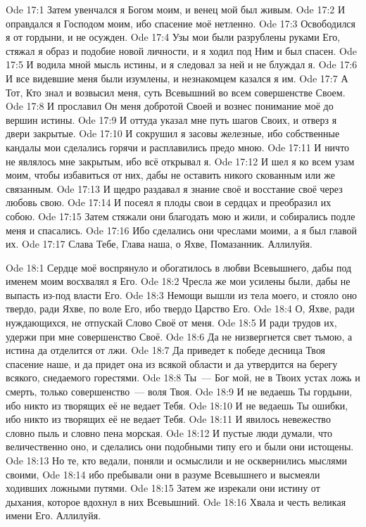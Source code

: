 \vs Ode 17:1
Затем
увенчался я Богом моим, и венец мой был живым.
\vs Ode 17:2
И оправдался я
Господом моим, ибо спасение моё нетленно.
\vs Ode 17:3
Освободился я
от гордыни, и не осужден.
\vs Ode 17:4
Узы мои были
разрублены руками Его, стяжал я образ и подобие новой личности, и я ходил под
Ним и был спасен.
\vs Ode 17:5
И водила мной
мысль истины, и я следовал за ней и не блуждал я.
\vs Ode 17:6
И все видевшие
меня были изумлены, и незнакомцем казался я им.
\vs Ode 17:7
А Тот, Кто
знал и возвысил меня, суть Всевышний во всем совершенстве Своем.
\vs Ode 17:8
И прославил Он
меня добротой Своей и вознес понимание моё до вершин истины.
\vs Ode 17:9
И оттуда
указал мне путь шагов Своих, и отверз я двери закрытые.
\vs Ode 17:10
И сокрушил я
засовы железные, ибо собственные кандалы мои сделались горячи и расплавились
предо мною.
\vs Ode 17:11
И ничто не
являлось мне закрытым, ибо всё открывал я.
\vs Ode 17:12
И шел я ко
всем узам моим, чтобы избавиться от них, дабы не оставить никого скованным или
же связанным.
\vs Ode 17:13
И щедро
раздавал я знание своё и восстание своё через любовь свою.
\vs Ode 17:14
И посеял я
плоды свои в сердцах и преобразил их собою.
\vs Ode 17:15
Затем стяжали
они благодать мою и жили, и собирались подле меня и спасались.
\vs Ode 17:16
Ибо сделались
они чреслами моими, а я был главой их.
\vs Ode 17:17
Слава Тебе,
Глава наша, о Яхве, Помазанник.
Аллилуйя.

\vs Ode 18:1
Сердце моё
воспрянуло и обогатилось в любви Всевышнего, дабы под именем моим восхвалял я
Его.
\vs Ode 18:2
Чресла же мои
усилены были, дабы не выпасть из-под власти Его.
\vs Ode 18:3
Немощи вышли
из тела моего, и стояло оно твердо, ради Яхве, по воле Его, ибо твердо Царство
Его.
\vs Ode 18:4
О, Яхве, ради
нуждающихся, не отпускай Слово Своё от меня.
\vs Ode 18:5
И ради трудов
их, удержи при мне совершенство Своё.
\vs Ode 18:6
Да не
низвергнется свет тьмою, а истина да отделится от лжи.
\vs Ode 18:7
Да приведет к
победе десница Твоя спасение наше, и да придет она из всякой области и да
утвердится на берегу всякого, снедаемого горестями.
\vs Ode 18:8
Ты~--- Бог мой,
не в Твоих устах ложь и смерть, только совершенство~--- воля Твоя.
\vs Ode 18:9
И не ведаешь
Ты гордыни, ибо никто из творящих её не ведает Тебя.
\vs Ode 18:10
И не ведаешь
Ты ошибки, ибо никто из творящих её не ведает Тебя.
\vs Ode 18:11
И явилось
невежество словно пыль и словно пена морская.
\vs Ode 18:12
И пустые люди
думали, что величественно оно, и сделались они подобными типу его и были они
истощены.
\vs Ode 18:13
Но те, кто
ведали, поняли и осмыслили и не осквернились мыслями своими,
\vs Ode 18:14
ибо пребывали
они в разуме Всевышнего и высмеяли ходивших ложными путями.
\vs Ode 18:15
Затем же
изрекали они истину от дыхания, которое вдохнул в них Всевышний.
\vs Ode 18:16
Хвала и честь
великая имени Его.
Аллилуйя.

